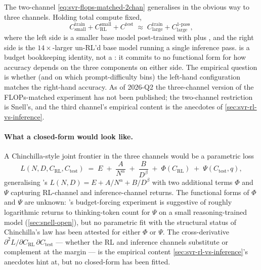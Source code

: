 The two-channel \cref{eq:svr-flops-matched-2chan} generalises in
the obvious way to three channels. Holding total compute fixed,
\begin{equation}
  C_\text{small}^\text{train} + C_\text{RL}^\text{small} + C^\text{test}
    \;\approx\; C_\text{large}^\text{train} + C_\text{large}^\text{1-pass},
  \label{eq:svr-three-channel-identity}
\end{equation}
where the left side is a smaller base model post-trained with 
plus , and the right side is the
$14\times$-larger un-RL'd base model running a single inference pass.
 is a budget bookkeeping
identity, not a : it commits to no functional form for
how accuracy depends on the three components on either side. The
empirical question is whether (and on which prompt-difficulty bins)
the left-hand configuration matches the right-hand accuracy. As of
2026-Q2 the three-channel version of the FLOPs-matched experiment
has not been published; the two-channel restriction is Snell's, and
the third channel's empirical content is the anecdotes of
\cref{sec:svr-rl-vs-inference}.

\paragraph{What a closed-form would look like.} A Chinchilla-style
joint frontier in the three channels would be a parametric loss
\begin{equation}
  L(N, D, C_\text{RL}, C_\text{test})
    \;=\; E
      \;+\; \frac{A}{N^{\alpha}}
      \;+\; \frac{B}{D^{\beta}}
      \;+\; \Phi(C_\text{RL})
      \;+\; \Psi(C_\text{test}, q),
  \label{eq:svr-hypothetical-frontier}
\end{equation}
generalising \citet[\S 3, Eq.~2]{hoffmann2022-chinchilla}'s
$L(N, D) = E + A/N^\alpha + B/D^\beta$ with two additional terms
$\Phi$ and $\Psi$ capturing RL-channel and inference-channel returns.
The functional forms of $\Phi$ and $\Psi$ are unknown:
\citet{s1-2025}'s budget-forcing experiment is suggestive of
roughly logarithmic returns to thinking-token count for $\Psi$ on a
small reasoning-trained model (\cref{sec:snell-open}), but no
parametric fit with the structural status of Chinchilla's law has
been attested for either $\Phi$ or $\Psi$. The cross-derivative
$\partial^2 L / \partial C_\text{RL}\, \partial C_\text{test}$ ---
whether the RL and inference channels substitute or complement at
the margin --- is the empirical content
\cref{sec:svr-rl-vs-inference}'s anecdotes hint at, but no
closed-form has been fitted.


